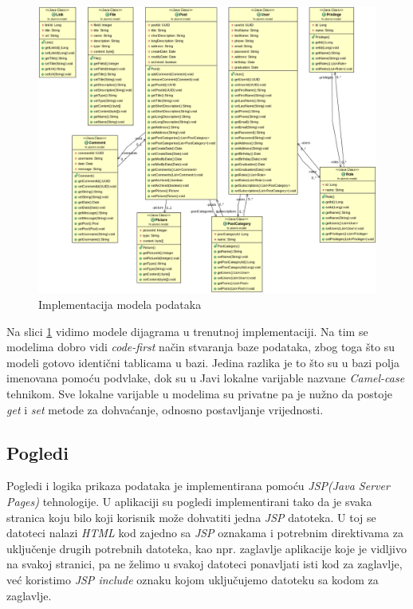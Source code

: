 \documentclass[zavrsni, numeric]{fer}
\begin{document}
\begin{figure}[H]
	\centering
	\includegraphics[width=13cm]{slike/modeli-dijagram.png}
	\caption{Implementacija modela podataka}
	\label{fig:modeli-dijagram}
\end{figure}

Na slici \ref{fig:modeli-dijagram} vidimo modele dijagrama u trenutnoj implementaciji. Na tim se modelima dobro vidi \textit{code-first} način stvaranja baze podataka, zbog toga što su modeli gotovo identični tablicama u bazi. Jedina razlika je to što su u bazi polja imenovana pomoću podvlake, dok su u Javi lokalne varijable nazvane \textit{Camel-case} tehnikom. Sve lokalne varijable u modelima su privatne pa je nužno da postoje \textit{get} i \textit{set} metode za dohvaćanje, odnosno postavljanje vrijednosti.

\subsection{Pogledi}
Pogledi i logika prikaza podataka je implementirana pomoću \textit{JSP(Java Server Pages)} tehnologije.  U aplikaciji su pogledi implementirani tako da je svaka stranica koju bilo koji korisnik može dohvatiti jedna \textit{JSP} datoteka. U toj se datoteci nalazi \textit{HTML} kod zajedno sa \textit{JSP} oznakama i potrebnim direktivama za uključenje drugih potrebnih datoteka, kao npr. zaglavlje aplikacije koje je vidljivo na svakoj stranici, pa ne želimo u svakoj datoteci ponavljati isti kod za zaglavlje, već koristimo \textit{JSP include} oznaku kojom uključujemo datoteku sa kodom za zaglavlje.
\end{document}
